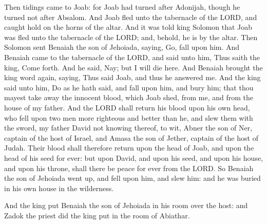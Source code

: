  Then tidings came to Joab: for Joab had turned after
Adonijah, though he turned not after Absalom. And Joab fled unto the
tabernacle of the LORD, and caught hold on the horns of the altar.
 And it was told king Solomon that Joab was fled unto the
tabernacle of the LORD; and, behold, he is by the altar. Then Solomon
sent Benaiah the son of Jehoiada, saying, Go, fall upon him.
 And Benaiah came to the tabernacle of the LORD, and said
unto him, Thus saith the king, Come forth. And he said, Nay; but I will
die here. And Benaiah brought the king word again, saying, Thus said
Joab, and thus he answered me.  And the king said unto him,
Do as he hath said, and fall upon him, and bury him; that thou mayest
take away the innocent blood, which Joab shed, from me, and from the
house of my father.  And the LORD shall return his blood
upon his own head, who fell upon two men more righteous and better than
he, and slew them with the sword, my father David not knowing thereof,
to wit, Abner the son of Ner, captain of the host of Israel, and Amasa
the son of Jether, captain of the host of Judah.  Their
blood shall therefore return upon the head of Joab, and upon the head of
his seed for ever: but upon David, and upon his seed, and upon his
house, and upon his throne, shall there be peace for ever from the LORD.
 So Benaiah the son of Jehoiada went up, and fell upon him,
and slew him: and he was buried in his own house in the wilderness.

 And the king put Benaiah the son of Jehoiada in his room
over the host: and Zadok the priest did the king put in the room of
Abiathar.

